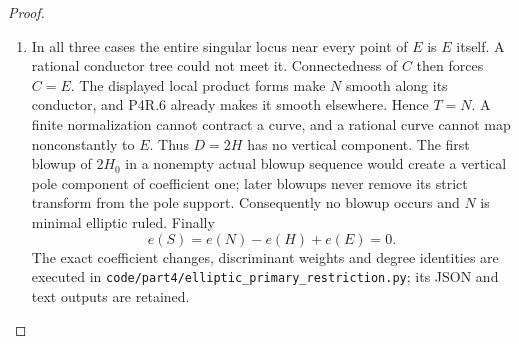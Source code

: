 \begin{proof}
\begin{enumerate}[label={$\langle1\rangle$\arabic*.},leftmargin=*]
\item In all three cases the entire singular
locus near every point of $E$ is $E$
itself. A rational conductor tree could
not meet it. Connectedness of $C$ then
forces $C=E$. The displayed local
product forms make $N$ smooth along
its conductor, and P4R.6 already makes
it smooth elsewhere. Hence $T=N$.
A finite normalization cannot contract
a curve, and a rational curve cannot
map nonconstantly to $E$. Thus $D=2H$
has no vertical component. The first
blowup of $2H_0$ in a nonempty actual
blowup sequence would create a vertical
pole component of coefficient one;
later blowups never remove its strict
transform from the pole support.
Consequently no blowup occurs and $N$
is minimal elliptic ruled. Finally
\[
 e(S)=e(N)-e(H)+e(E)=0.
\]
The exact coefficient changes, discriminant
weights and degree identities are executed
in \texttt{code/part4/elliptic\_primary\_restriction.py};
its JSON and text outputs are retained.

\end{enumerate}
\end{proof}
